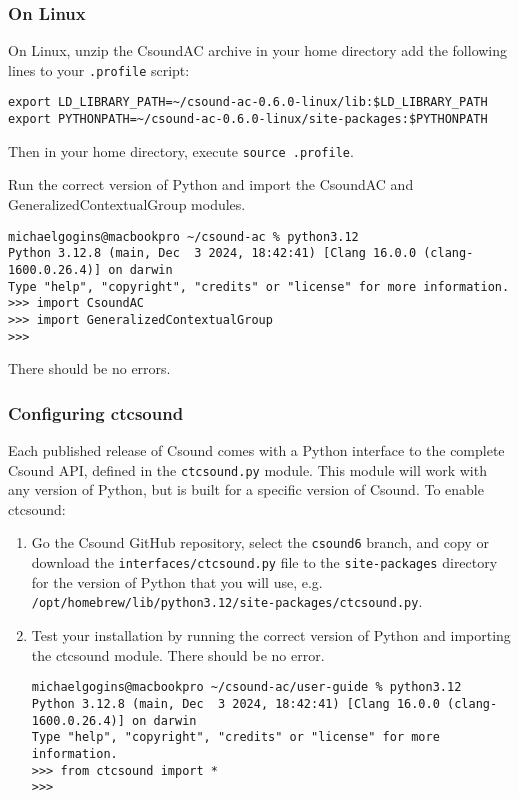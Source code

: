 \documentclass[letterpaper,10pt,DIV=12,parskip=half]{scrartcl}
\begin{document}
\subsubsection{On Linux}

On Linux, unzip the CsoundAC archive in your home directory add the following lines to your \lstinline|.profile| script:

\begin{lstlisting}
export LD_LIBRARY_PATH=~/csound-ac-0.6.0-linux/lib:$LD_LIBRARY_PATH
export PYTHONPATH=~/csound-ac-0.6.0-linux/site-packages:$PYTHONPATH
\end{lstlisting}

Then in your home directory, execute \lstinline|source .profile|.

Run the correct version of Python and import the CsoundAC and GeneralizedContextualGroup modules. 

\begin{lstlisting}[basicstyle=\small\ttfamily]
michaelgogins@macbookpro ~/csound-ac % python3.12
Python 3.12.8 (main, Dec  3 2024, 18:42:41) [Clang 16.0.0 (clang-1600.0.26.4)] on darwin
Type "help", "copyright", "credits" or "license" for more information.
>>> import CsoundAC
>>> import GeneralizedContextualGroup
>>> 
\end{lstlisting}

There should be no errors.

\subsubsection{Configuring ctcsound}

Each published release of Csound comes with a Python interface to the complete Csound API, defined in the \lstinline|ctcsound.py| module. This module will work with any version of Python, but is built for a specific version of Csound. To enable ctcsound:

\begin{enumerate}

\item Go the Csound GitHub repository, select the \lstinline|csound6| branch, and copy or download the \lstinline|interfaces/ctcsound.py| file to the \lstinline|site-packages| directory for the version of Python that you will use, e.g. \lstinline|/opt/homebrew/lib/python3.12/site-packages/ctcsound.py|.

\item Test your installation by running the correct version of Python and importing the ctcsound module. There should be no error.

\begin{lstlisting}[basicstyle=\small\ttfamily]
michaelgogins@macbookpro ~/csound-ac/user-guide % python3.12
Python 3.12.8 (main, Dec  3 2024, 18:42:41) [Clang 16.0.0 (clang-1600.0.26.4)] on darwin
Type "help", "copyright", "credits" or "license" for more information.
>>> from ctcsound import *
>>> 
\end{lstlisting}

\end{enumerate}
\end{document}
